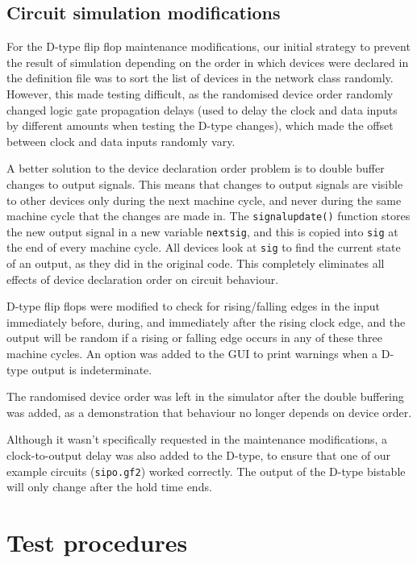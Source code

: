 \documentclass[a4paper,10pt]{article}
\begin{document}
\subsection{Circuit simulation modifications}
For the D-type flip flop maintenance modifications, our initial strategy to prevent the result of simulation depending on the order in which devices were declared in the definition file was to sort the list of devices in the network class randomly. However, this made testing difficult, as the randomised device order randomly changed logic gate propagation delays (used to delay the clock and data inputs by different amounts when testing the D-type changes), which made the offset between clock and data inputs randomly vary. 

A better solution to the device declaration order problem is to double buffer changes to output signals. This means that changes to output signals are visible to other devices only during the next machine cycle, and never during the same machine cycle that the changes are made in. The \texttt{signalupdate()} function stores the new output signal in a new variable \texttt{nextsig}, and this is copied into \texttt{sig} at the end of every machine cycle. All devices look at \texttt{sig} to find the current state of an output, as they did in the original code. This completely eliminates all effects of device declaration order on circuit behaviour. 

D-type flip flops were modified to check for rising/falling edges in the input immediately before, during, and immediately after the rising clock edge, and the output will be random if a rising or falling edge occurs in any of these three machine cycles. An option was added to the GUI to print warnings when a D-type output is indeterminate.

The randomised device order was left in the simulator after the double buffering was added, as a demonstration that behaviour no longer depends on device order. 

Although it wasn't specifically requested in the maintenance modifications, a clock-to-output delay was also added to the D-type, to ensure that one of our example circuits (\texttt{sipo.gf2}) worked correctly. The output of the D-type bistable will only change after the hold time ends. 

\section{Test procedures}
\end{document}
